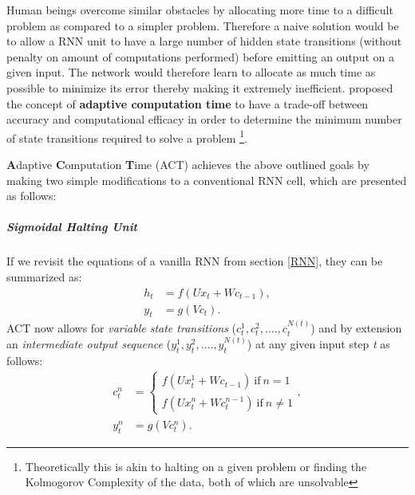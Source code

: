 Human beings overcome similar obstacles by allocating more time to a difficult problem as compared to a simpler problem. Therefore a naive solution would be to allow a RNN unit to have a large number of hidden state transitions (without penalty on amount of computations performed) before emitting an output on a given input. The network would therefore learn to allocate as much time as possible to minimize its error thereby making it extremely inefficient. \cite{Graves2016} proposed the concept of \textbf{adaptive computation time} to have a trade-off between accuracy and computational efficacy in order to determine the minimum number of state transitions required to solve a problem \footnote{Theoretically this is akin to halting on a given problem or finding the Kolmogorov Complexity of the data, both of which are unsolvable}.

\textbf{A}daptive \textbf{C}omputation \textbf{T}ime (ACT) achieves the above outlined goals by making two simple modifications to a conventional RNN cell, which are presented as follows:

\subparagraph{Sigmoidal Halting Unit} If we revisit the equations of a vanilla RNN from section \ref{RNN}, they can be summarized as:
\begin{equation}
\begin{aligned}
h_t &= f(Ux_t + Wc_{t-1}), \\
y_t &= g(Vc_t).
\end{aligned}
\end{equation}
ACT now allows for \textit{variable state transitions} ($c_t^1, c_t^2,...., c_t^{N(t)}$) and by extension an \textit{intermediate output sequence} ($y_t^1, y_t^2,...., y_t^{N(t)}$) at any given input step \textit{t} as follows:
\begin{equation}
\begin{aligned}
c_t^n &= \begin{cases} f(Ux_t^1 + Wc_{t-1})\ \text{if}\ n = 1 \\ f(Ux_t^n + Wc_t^{n-1})\ \text{if}\ n \neq 1  \end{cases}, \\
y_t^n &= g(Vc_t^n).
\end{aligned}
\end{equation}

